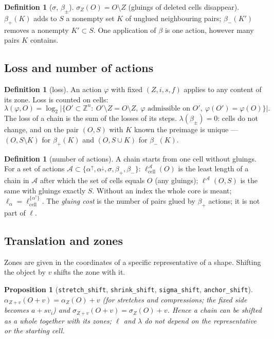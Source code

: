 \documentclass[11pt,a4paper]{article}
\theoremstyle{plain}
\newtheorem{proposition}[theorem]{Proposition}
\theoremstyle{definition}
\newtheorem{definition}[theorem]{Definition}
\theoremstyle{remark}
\newcommand{\Z}{\mathbb{Z}}
\newcommand{\lc}{\ell_{\mathrm{cell}}}
\newcommand{\lean}[1]{\texttt{#1}}
\begin{document}
\begin{definition}[$\sigma$, $\beta_\pm$]
$\sigma_Z(O)=O\setminus Z$ (gluings of deleted cells disappear). $\beta_+(K)$ adds to $S$ a nonempty set $K$ of unglued neighbouring pairs; $\beta_-(K')$ removes a nonempty $K'\subset S$. One application of $\beta$ is one action, however many pairs $K$ contains.
\end{definition}

\subsection{Loss and number of actions}

\begin{definition}[loss]
An action $\varphi$ with fixed $(Z,i,s,f)$ applies to any content of its zone. Loss is counted on cells:
\[
\lambda(\varphi,O)=\log_2\bigl|\{O'\subset\Z^n:\ O'\setminus Z=O\setminus Z,\ \varphi\text{ admissible on }O',\ \varphi(O')=\varphi(O)\}\bigr|.
\]
The loss of a chain is the sum of the losses of its steps. $\lambda(\beta_\pm)=0$: cells do not change, and on the pair $(O,S)$ with $K$ known the preimage is unique — $(O,S\setminus K)$ for $\beta_+(K)$ and $(O,S\cup K)$ for $\beta_-(K)$.
\end{definition}

\begin{definition}[number of actions]
A chain starts from one cell without gluings. For a set of actions $\mathcal A\subset\{\alpha^\uparrow,\alpha^\downarrow,\sigma,\beta_+,\beta_-\}$:
$\lc^{\mathcal A}(O)$ is the least length of a chain in $\mathcal A$ after which the set of cells equals $O$ (any gluings);
$\ell^{\mathcal A}(O,S)$ is the same with gluings exactly $S$.
Without an index the whole core is meant; $\ell_\alpha=\lc^{\{\alpha^\uparrow\}}$. The \emph{gluing cost} is the number of pairs glued by $\beta_+$ actions; it is not part of $\ell$.
\end{definition}

\subsection{Translation and zones}\label{sec:shift}

Zones are given in the coordinates of a specific representative of a shape. Shifting the object by $v$ shifts the zone with it.

\begin{proposition}[\lean{stretch\_shift}, \lean{shrink\_shift}, \lean{sigma\_shift}, \lean{anchor\_shift}]
$\alpha_{Z+v}(O+v)=\alpha_Z(O)+v$ (for stretches and compressions; the fixed side becomes $a+sv_i$) and $\sigma_{Z+v}(O+v)=\sigma_Z(O)+v$. Hence a chain can be shifted as a whole together with its zones; $\ell$ and $\lambda$ do not depend on the representative or the starting cell.
\end{proposition}
\end{document}
